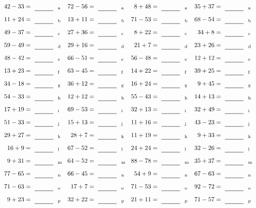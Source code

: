 \documentclass
[
  draft    = true,
  fontsize = 11pt,
  parskip  = half-
]
{scrartcl}
\begin{document}
\clearpage
\begin{align*}
    \pline{42-33}&=\rline{a}
  & \pline{72-56}&=\rline{a}
  & \pline{8+48}&=\rline{a}
  & \pline{35+37}&=\rline{a} \\[1ex]
    \pline{11+24}&=\rline{b}
  & \pline{13+11}&=\rline{b}
  & \pline{71-53}&=\rline{b}
  & \pline{68-54}&=\rline{b} \\[1ex]
    \pline{49-37}&=\rline{c}
  & \pline{27+36}&=\rline{c}
  & \pline{8+22}&=\rline{c}
  & \pline{34+8}&=\rline{c} \\[1ex]
    \pline{59-49}&=\rline{d}
  & \pline{29+16}&=\rline{d}
  & \pline{21+7}&=\rline{d}
  & \pline{23+26}&=\rline{d} \\[1ex]
    \pline{48-42}&=\rline{e}
  & \pline{66-51}&=\rline{e}
  & \pline{56-48}&=\rline{e}
  & \pline{12+12}&=\rline{e} \\[1ex]
    \pline{13+23}&=\rline{f}
  & \pline{63-45}&=\rline{f}
  & \pline{14+22}&=\rline{f}
  & \pline{39+25}&=\rline{f} \\[1ex]
    \pline{34-18}&=\rline{g}
  & \pline{36+12}&=\rline{g}
  & \pline{16+24}&=\rline{g}
  & \pline{9+45}&=\rline{g} \\[1ex]
    \pline{54-33}&=\rline{h}
  & \pline{12+12}&=\rline{h}
  & \pline{55-43}&=\rline{h}
  & \pline{14+13}&=\rline{h} \\[1ex]
    \pline{17+19}&=\rline{i}
  & \pline{69-53}&=\rline{i}
  & \pline{32+13}&=\rline{i}
  & \pline{32+49}&=\rline{i} \\[1ex]
    \pline{51-33}&=\rline{j}
  & \pline{15+13}&=\rline{j}
  & \pline{11+16}&=\rline{j}
  & \pline{43-23}&=\rline{j} \\[1ex]
    \pline{29+27}&=\rline{k}
  & \pline{28+7}&=\rline{k}
  & \pline{11+19}&=\rline{k}
  & \pline{9+33}&=\rline{k} \\[1ex]
    \pline{16+9}&=\rline{l}
  & \pline{67-52}&=\rline{l}
  & \pline{24+24}&=\rline{l}
  & \pline{32-26}&=\rline{l} \\[1ex]
    \pline{9+31}&=\rline{m}
  & \pline{64-52}&=\rline{m}
  & \pline{88-78}&=\rline{m}
  & \pline{35+37}&=\rline{m} \\[1ex]
    \pline{77-65}&=\rline{n}
  & \pline{66-45}&=\rline{n}
  & \pline{54+9}&=\rline{n}
  & \pline{67-63}&=\rline{n} \\[1ex]
    \pline{71-63}&=\rline{o}
  & \pline{17+7}&=\rline{o}
  & \pline{71-53}&=\rline{o}
  & \pline{92-72}&=\rline{o} \\[1ex]
    \pline{9+23}&=\rline{p}
  & \pline{32+22}&=\rline{p}
  & \pline{21+11}&=\rline{p}
  & \pline{71-57}&=\rline{p}
\end{align*}
\end{document}
